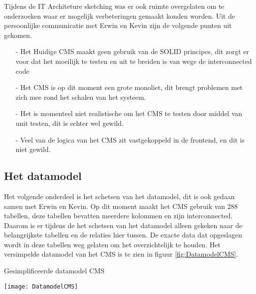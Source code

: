 
\whitespace
Tijdens de IT Architeture sketching was er ook ruimte overgelaten om te onderzoeken waar er mogelijk verbeteringen gemaakt konden worden.
Uit de persoonlijke communicatie met Erwin en Kevin zijn de volgende punten uit gekomen.

\begin{itemize}
	\item[-]{Het Huidige \gls{CMS} maakt geen gebruik van de SOLID principes, dit zorgt er voor dat het moeilijk te testen en uit te breiden is van wege de interconnected code}
	\item[-]{Het \gls{CMS} is op dit moment een grote monoliet, dit brengt problemen met zich mee rond het schalen van het systeem.}
	\item[-]{Het is momenteel niet realistische om het \gls{CMS} te testen door middel van unit testen, dit is echter wel gewild.}
    \item[-]{Veel van de logica van het CMS zit vastgekoppeld in de frontend, en dit is niet gewild.}
\end{itemize}

\newpage
\subsection{Het datamodel}
Het volgende onderdeel is het schetsen van het datamodel, dit is ook gedaan samen met Erwin en Kevin.
Op dit moment maakt het \gls{CMS} gebruik van 288 tabellen, deze tabellen bevatten meerdere kolommen en zijn interconnected.
Daarom is er tijdens de het schetsen van het datamodel alleen gekeken naar de belangrijkste tabellen en de relaties hier tussen.
De exacte data dat opgeslagen wordt in deze tabellen weg gelaten om het overzichtelijk te houden.
Het versimpelde datamodel van het CMS is te zien in figuur \ref{fig:DatamodelCMS}.

\begin{graphic}
	\captionsetup{type=figure}
	\caption{Gesimplificeerde datamodel CMS}
	\texttt{[image: DatamodelCMS]}
	\label{fig:DatamodelCMS}
\end{graphic}

